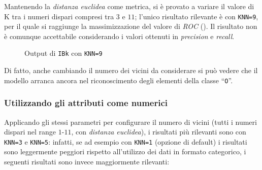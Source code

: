 Mantenendo la \emph{distanza euclidea} come metrica, si è provato a variare il valore di K tra i numeri dispari compresi tra \(3\) e \(11\);
l'unico risultato rilevante è con \texttt{KNN=9}, per il quale si raggiunge la massimizzazione del valore di \emph{ROC} ().
Il risultato non è comunque accettabile considerando i valori ottenuti in \emph{precision} e \emph{recall}.



\begin{figure}[H]
  \centering
  \caption{Output di \texttt{IBk} con \texttt{KNN=9}}%
  \label{fig:ibk:9}
\end{figure}

Di fatto, anche cambiando il numero dei vicini da considerare si può vedere che il modello arranca ancora nel riconoscimento degli elementi della classe ``\texttt{O}''.

\subsubsection{Utilizzando gli attributi come numerici}\label{subsub:ibk:numeric}

Applicando gli stessi parametri per configurare il numero di vicini (tutti i numeri dispari nel range \(1\)-\(11\), con \emph{distanza euclidea}), i risultati più rilevanti sono con \texttt{KNN=3} e \texttt{KNN=5}:
infatti, se ad esempio con \texttt{KNN=1} (opzione di default) i risultati sono leggermente peggiori rispetto all'utilizzo dei dati in formato categorico, i seguenti risultati sono invece maggiormente rilevanti:

